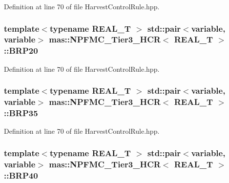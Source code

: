 Definition at line 70 of file Harvest\-Control\-Rule.\-hpp.

\hypertarget{structmas_1_1_n_p_f_m_c___tier3___h_c_r_a6dbb8dfb2765b64d3fb0ba474ab24003}{
\subsubsection[{B\-R\-P20}]{\setlength{\rightskip}{0pt plus 5cm}template$<$typename R\-E\-A\-L\-\_\-\-T $>$ std\-::pair$<${\bf variable}, {\bf variable}$>$ {\bf mas\-::\-N\-P\-F\-M\-C\-\_\-\-Tier3\-\_\-\-H\-C\-R}$<$ R\-E\-A\-L\-\_\-\-T $>$\-::B\-R\-P20}}\label{structmas_1_1_n_p_f_m_c___tier3___h_c_r_a6dbb8dfb2765b64d3fb0ba474ab24003}


Definition at line 70 of file Harvest\-Control\-Rule.\-hpp.

\hypertarget{structmas_1_1_n_p_f_m_c___tier3___h_c_r_a6962cd915784729c57541f02694a71b0}{
\subsubsection[{B\-R\-P35}]{\setlength{\rightskip}{0pt plus 5cm}template$<$typename R\-E\-A\-L\-\_\-\-T $>$ std\-::pair$<${\bf variable}, {\bf variable}$>$ {\bf mas\-::\-N\-P\-F\-M\-C\-\_\-\-Tier3\-\_\-\-H\-C\-R}$<$ R\-E\-A\-L\-\_\-\-T $>$\-::B\-R\-P35}}\label{structmas_1_1_n_p_f_m_c___tier3___h_c_r_a6962cd915784729c57541f02694a71b0}


Definition at line 70 of file Harvest\-Control\-Rule.\-hpp.

\hypertarget{structmas_1_1_n_p_f_m_c___tier3___h_c_r_af0fb6ed0057002e7e92172f725ad6534}{
\subsubsection[{B\-R\-P40}]{\setlength{\rightskip}{0pt plus 5cm}template$<$typename R\-E\-A\-L\-\_\-\-T $>$ std\-::pair$<${\bf variable}, {\bf variable}$>$ {\bf mas\-::\-N\-P\-F\-M\-C\-\_\-\-Tier3\-\_\-\-H\-C\-R}$<$ R\-E\-A\-L\-\_\-\-T $>$\-::B\-R\-P40}}\label{structmas_1_1_n_p_f_m_c___tier3___h_c_r_af0fb6ed0057002e7e92172f725ad6534}



